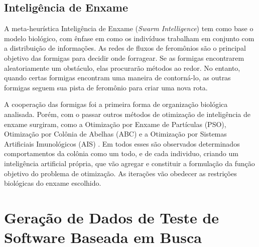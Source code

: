 \subsection{Inteligência de Enxame}

A meta-heurística Inteligência de Enxame (\textit{Swarm Intelligence}) tem como base o modelo biológico, com ênfase em como os indivíduos trabalham em conjunto com a distribuição de informações. As redes de fluxos de feromônios são o principal objetivo das formigas para decidir onde forragear. Se as formigas encontrarem aleatoriamente um obstáculo, elas procurarão métodos ao redor. No entanto, quando certas formigas encontram uma maneira de contorná-lo, as outras formigas seguem sua pista de feromônio para criar uma nova rota.

A cooperação das formigas foi a primeira forma de organização biológica analisada. Porém, com o passar outros métodos de otimização de inteligência de enxame surgiram, como a Otimização por Enxame de Partículas (PSO), Otimização por Colônia de Abelhas (ABC) e a Otimização por Sistemas Artificiais Imunológicos (AIS) \cite{blum2008swarm}. Em todos esses são observados determinados comportamentos da colônia como um todo, e de cada individuo, criando um inteligência artificial própria, que vão agregar e constituir a formulação da função objetivo do problema de otimização. As iterações vão obedecer as restrições biológicas do enxame escolhido.

\section{Geração de Dados de Teste de Software Baseada em Busca}



